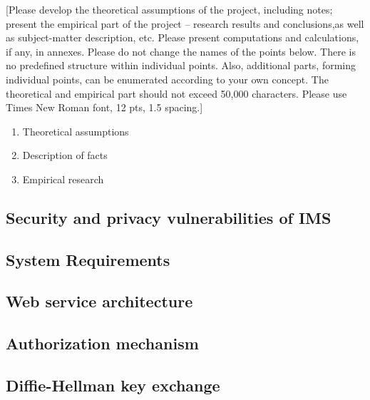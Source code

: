 [Please develop the theoretical assumptions of the project, including notes;
present the empirical part of the project -- research results and conclusions,as well as subject-matter description, etc.
Please present computations and calculations, if any, in annexes.
Please do not change the names of the points below.
There is no predefined structure within individual points.
Also, additional parts, forming individual points, can be enumerated according to your own concept.
The theoretical and empirical part should not exceed 50,000 characters.
Please use Times New Roman font, 12 pts, 1.5 spacing.]
\begin{enumerate}
    \item Theoretical assumptions
    \item Description of facts
    \item Empirical research
\end{enumerate}

\subsection{Security and privacy vulnerabilities of IMS}\label{subsec:security-and-privacy-vulnerabilities-of-ims}


\subsection{System Requirements}\label{subsec:system-requirements}


\subsection{Web service architecture}\label{subsec:web-service-architecture}


\subsection{Authorization mechanism}\label{subsec:authorization-mechanism}


\subsection{Diffie-Hellman key exchange}\label{subsec:diffie-hellman-key-exchange}
